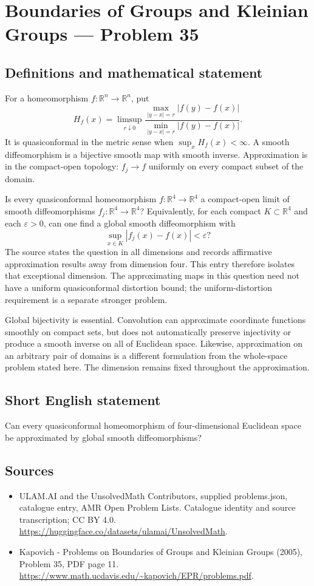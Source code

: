 \documentclass[11pt,a4paper]{article}
\begin{document}
\section*{Boundaries of Groups and Kleinian Groups — Problem 35}\label{statement}

\subsection{Definitions and mathematical statement}
For a homeomorphism $f:\mathbb R^n\to\mathbb R^n$, put
\[
 H_f(x)=\limsup_{r\downarrow0}
 \frac{\max_{|y-x|=r}|f(y)-f(x)|}
      {\min_{|y-x|=r}|f(y)-f(x)|}.
\]
It is quasiconformal in the metric sense when $\sup_x H_f(x)<\infty$. A smooth diffeomorphism is a bijective smooth map with smooth inverse. Approximation is in the compact-open topology: $f_j\to f$ uniformly on every compact subset of the domain.

Is every quasiconformal homeomorphism $f:\mathbb R^4\to\mathbb R^4$ a compact-open limit of smooth diffeomorphisms $f_j:\mathbb R^4\to\mathbb R^4$? Equivalently, for each compact $K\subset\mathbb R^4$ and each $\varepsilon>0$, can one find a global smooth diffeomorphism with
\[
 \sup_{x\in K}|f_j(x)-f(x)|<\varepsilon?
\]
The source states the question in all dimensions and records affirmative approximation results away from dimension four. This entry therefore isolates that exceptional dimension. The approximating maps in this question need not have a uniform quasiconformal distortion bound; the uniform-distortion requirement is a separate stronger problem.

Global bijectivity is essential. Convolution can approximate coordinate functions smoothly on compact sets, but does not automatically preserve injectivity or produce a smooth inverse on all of Euclidean space. Likewise, approximation on an arbitrary pair of domains is a different formulation from the whole-space problem stated here. The dimension remains fixed throughout the approximation.
\subsection{Short English statement}
Can every quasiconformal homeomorphism of four-dimensional Euclidean space be approximated by global smooth diffeomorphisms?
\subsection{Sources}
\begin{itemize}
\item[S1] ULAM.AI and the UnsolvedMath Contributors, supplied problems.json, catalogue entry, AMR Open Problem Lists. Catalogue identity and source transcription; CC BY 4.0.
\url{https://huggingface.co/datasets/ulamai/UnsolvedMath}.
\item[S2] Kapovich - Problems on Boundaries of Groups and Kleinian Groups (2005), Problem 35, PDF page 11. 
\url{https://www.math.ucdavis.edu/~kapovich/EPR/problems.pdf}.
\end{itemize}
\end{document}

